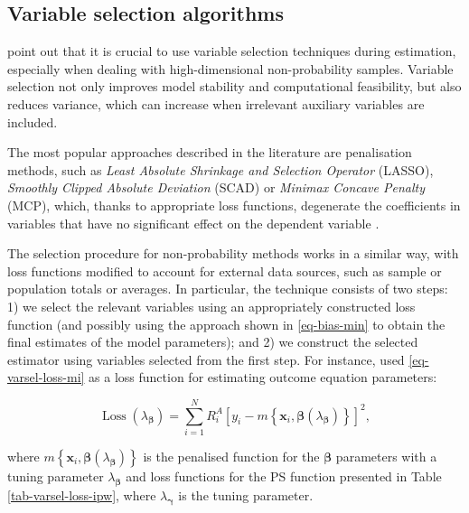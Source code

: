 \documentclass[
]{jss}
\begin{document}
\subsection{Variable selection algorithms}\label{sec-varsel}

\citet{yang_asymptotic_2020} point out that it is crucial to use
variable selection techniques during estimation, especially when dealing
with high-dimensional non-probability samples. Variable selection not
only improves model stability and computational feasibility, but also
reduces variance, which can increase when irrelevant auxiliary variables
are included.

The most popular approaches described in the literature are penalisation
methods, such as
\textit{Least Absolute Shrinkage and Selection Operator} (LASSO),
\textit{Smoothly Clipped Absolute Deviation} (SCAD) or
\textit{Minimax Concave Penalty} (MCP), which, thanks to appropriate
loss functions, degenerate the coefficients in variables that have no
significant effect on the dependent variable
\citep[cf.][]{tibshirani1996regression, ncvreg}.

The selection procedure for non-probability methods works in a similar
way, with loss functions modified to account for external data sources,
such as sample or population totals or averages. In particular, the
technique consists of two steps: 1) we select the relevant variables
using an appropriately constructed loss function (and possibly using the
approach shown in \eqref{eq-bias-min} to obtain the final estimates of
the model parameters); and 2) we construct the selected estimator using
variables selected from the first step. For instance,
\citet{yang_doubly_2020} used \eqref{eq-varsel-loss-mi} as a loss
function for estimating outcome equation parameters:

\begin{equation}  
\operatorname{Loss}\left(\lambda_{\boldsymbol{\beta}}\right)=\sum_{i=1}^N R_i^A\left[y_i-m\left\{\boldsymbol{x}_i, \boldsymbol{\beta}(\lambda_{\boldsymbol{\beta}})\right\}\right]^2,
\label{eq-varsel-loss-mi}
\end{equation}

where
\(m\left\{\boldsymbol{x}_i, \boldsymbol{\beta}(\lambda_{\boldsymbol{\beta}})\right\}\)
is the penalised function for the \(\boldsymbol{\beta}\) parameters with
a tuning parameter \(\lambda_{\boldsymbol{\beta}}\) and loss functions
for the PS function presented in Table \ref{tab-varsel-loss-ipw}, where
\(\lambda_{\boldsymbol{\gamma}}\) is the tuning parameter.
\end{document}
